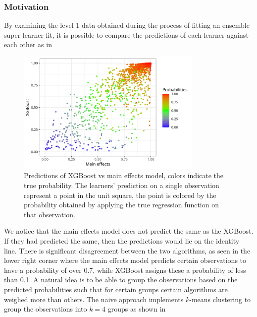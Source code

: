 \documentclass[./main.tex]{subfiles}
\begin{document}
\subsubsection{Motivation}
By examining the level 1 data obtained during the process of fitting an ensemble super learner fit, it is possible to compare the predictions of each learner against each other as in 
\begin{figure}[H]
    \centering
    \includegraphics[width=0.8\textwidth]{figures/esl_preds_xgboost_vs_main.png}
    \caption{Predictions of XGBoost vs main effects model, colors indicate the true probability. The learners' prediction on a single observation represent a point in the unit square, the point is colored by the probability obtained by applying the true regression function on that observation.}
    \label{fig:esl_preds_xgboost_vs_main}
\end{figure}
We notice that the main effects model does not predict the same as the XGBoost. If they had predicted the same, then the predictions would lie on the identity line. There is significant disagreement between the two algorithms, as seen in the lower right corner where the main effects model predicts certain observations to have a probability of over 0.7, while XGBoost assigns these a probability of less than 0.1. A natural idea is to be able to group the observations based on the predicted probabilities such that for certain groups certain algorithms are weighed more than others. The naive approach implements $ k $-means clustering to group the observations into $ k = 4 $ groups as shown in  
\end{document}
